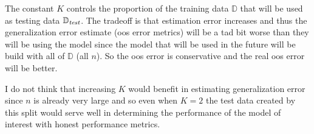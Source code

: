 \documentclass[12pt]{article}
\begin{document}
\begin{enumerate}



\begin{tcolorbox}[colback=white, sharp corners]

The constant $K$ controls the proportion of the training data $\mathbb{D}$ that will be used as testing data $\mathbb{D}_{\emph{test}}$. The tradeoff is that estimation error increases and thus the generalization error estimate (oos error metrics) will be a tad bit worse than they will be using the model since the model that will be used in the future will be build with all of $\mathbb{D}$ (all $n$). So the oos error is conservative and the real oos error will be better. 

\end{tcolorbox}



\begin{tcolorbox}[colback=white, sharp corners]
I do not think that increasing $K$ would benefit in estimating generalization error since $n$ is already very large and so even when $K=2$ the test data created by this split would serve well in determining the performance of the model of interest with honest performance metrics.
\end{tcolorbox}




\end{enumerate}
\end{document}
